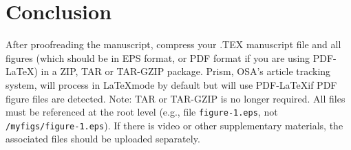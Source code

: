 \documentclass[10pt]{article}
\begin{document}
\section{Conclusion}
After proofreading the manuscript, compress your .TEX manuscript file and all figures (which should be in EPS format, or PDF format if you are using PDF-\LaTeX) in a ZIP, TAR or TAR-GZIP package. Prism, OSA's article tracking system, will process in \LaTeX mode by default but will use PDF-\LaTeX if PDF figure files are detected. Note: TAR or TAR-GZIP is no longer required. All files must be referenced at the root level (e.g., file \texttt{figure-1.eps}, not \texttt{/myfigs/figure-1.eps}). If there is video or other supplementary materials, the associated files should be uploaded separately.
\end{document}
